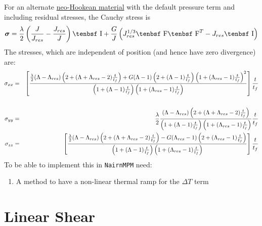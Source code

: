 \documentclass[11pt]{book}
\newcommand{\tens}[1]{\boldsymbol{\mathsf{#1}}}
\def\F{\hbox{\tenbsf F}}
\def\I{\hbox{\tenbsf I}}
\def\Jres{J_{res}}
\begin{document}
For an alternate \hyperref[NHM]{neo-Hookean material} with the default pressure term and including residual stresses, the Cauchy stress is
\begin{equation}
     \tens\sigma = {\lambda\over 2}\left({J\over\Jres}- {\Jres\over J}\right)\I + { G\over J}\left( \Jres^{1/3}\F\F^T - \Jres\I\right) 
\end{equation}
The stresses, which are independent of position (and hence have zero divergence) are:
\begin{eqnarray}
    \sigma_{xx} & = & \left[ {{\lambda\over 2}(\Lambda-\Lambda_{res})\left(2 + (\Lambda+\Lambda_{res}-2){t\over t_f}\right) 
                                      +  G  (\Lambda-1) \left(2 + (\Lambda-1){t\over t_f}\right)\left(1 + (\Lambda_{res}-1){t\over t_f}\right)^2\over
                                     \left(1 + (\Lambda-1){t\over t_f}\right) \left(1 + (\Lambda_{res}-1){t\over t_f}\right)}
                                      \right]  {t\over t_f }  \nonumber\\ &&\\
    \sigma_{yy} & = &  {\lambda\over 2} {(\Lambda-\Lambda_{res})\left(2 + (\Lambda+\Lambda_{res}-2){t\over t_f}\right) \over
                                    \left(1 + (\Lambda-1){t\over t_f}\right) \left(1 + (\Lambda_{res}-1){t\over t_f}\right)}{t\over t_f } \\
    \sigma_{zz} & = & \left[  {{\lambda\over 2}(\Lambda-\Lambda_{res})\left(2 + (\Lambda+\Lambda_{res}-2){t\over t_f}\right)  - G (\Lambda_{res}-1) \left(2 + (\Lambda_{res}-1){t\over t_f}\right)\over
                                     \left(1 + (\Lambda-1){t\over t_f}\right) \left(1 + (\Lambda_{res}-1){t\over t_f}\right)}\right]  {t\over t_f }  
\end{eqnarray}
To be able to implement this in {\tt NairnMPM} need:
\begin{enumerate}
\item A method to have a non-linear thermal ramp for the $\Delta T$ term
\end{enumerate}

\section{Linear Shear}
\end{document}

